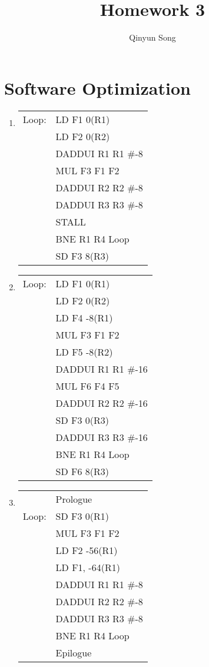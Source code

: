 \documentclass{article}
\title{Homework 3}
\author{Qinyun Song}
\date{}
\begin{document}
    \maketitle

    \section{Software Optimization}
    \begin{enumerate}
    \item \begin{tabular}{c l}
	Loop: & LD F1 0(R1) \\
	    & LD F2 0(R2) \\
	    & DADDUI R1 R1 \#-8 \\
	    & MUL F3 F1 F2 \\
	    & DADDUI R2 R2 \#-8 \\
	    & DADDUI R3 R3 \#-8 \\
	    & STALL \\
	    & BNE R1 R4 Loop \\
	    & SD F3 8(R3)
    \end{tabular}
    \item \begin{tabular}{c l}
	Loop: & LD F1 0(R1) \\
	    & LD F2 0(R2) \\
	    & LD F4 -8(R1) \\
	    & MUL F3 F1 F2 \\
	    & LD F5 -8(R2) \\
	    & DADDUI R1 R1 \#-16 \\
	    & MUL F6 F4 F5 \\
	    & DADDUI R2 R2 \#-16 \\
	    & SD F3 0(R3) \\
	    & DADDUI R3 R3 \#-16 \\
	    & BNE R1 R4 Loop \\
	    & SD F6 8(R3)
	\end{tabular}
    \item \begin{tabular}{c l}
    & Prologue \\
    Loop: & SD F3 0(R1) \\
    & MUL F3 F1 F2 \\
    & LD F2 -56(R1) \\
    & LD F1, -64(R1) \\
    & DADDUI R1 R1 \#-8 \\
    & DADDUI R2 R2 \#-8 \\
    & DADDUI R3 R3 \#-8 \\
    &BNE R1 R4 Loop \\
    & Epilogue
    \end{tabular}
    \end{enumerate} 
\end{document}
